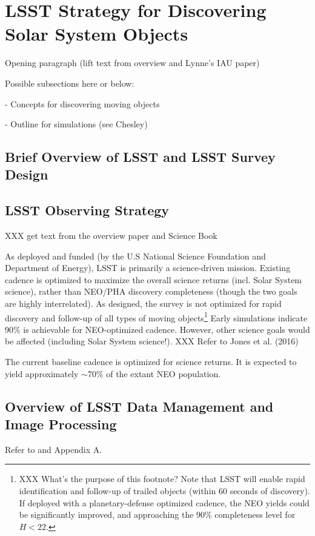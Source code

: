 
\section{LSST Strategy for Discovering Solar System Objects} 

Opening paragraph (lift text from overview and Lynne's IAU paper) 

Possible subsections here or below:

- Concepts for discovering moving objects

- Outline for simulations (see Chesley) 


\subsection{Brief Overview of LSST and LSST Survey Design} 
% 


\subsection{LSST Observing Strategy} 

XXX get text from the overview paper and Science Book 

As deployed and funded (by the U.S National Science Foundation and
Department of Energy), LSST is primarily a science-driven mission. 
Existing cadence is optimized to maximize the overall science returns
(incl. Solar System science), rather than NEO/PHA discovery
completeness (though the two goals are highly interrelated).  As designed, the survey is not optimized for rapid
discovery and follow-up of all types of moving objects\footnote{
XXX What's the purpose of this footnote? Note that LSST will enable rapid identification and follow-up of
trailed objects (within 60 seconds of discovery). If deployed with a 
planetary-defense optimized cadence, the NEO yields could be
significantly improved, and approaching the 90\% completeness level
for $H<22$.} 
Early simulations indicate 90\% is achievable for NEO-optimized
cadence. However, other science goals would be affected (including
Solar System science!).  XXX Refer to Jones et al.  (2016) 

The current baseline cadence is optimized for science returns.
It is expected to yield approximately $\sim$70\% of the extant NEO population.


\subsection{Overview of LSST  Data Management and Image Processing} 

Refer to \cite{DM2016} and Appendix A. 

